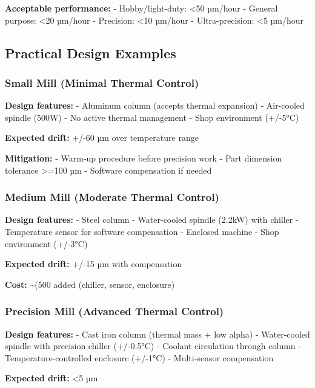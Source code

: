 \documentclass[
]{article}
\begin{document}
\textbf{Acceptable performance:} - Hobby/light-duty: \textless50 µm/hour
- General purpose: \textless20 µm/hour - Precision: \textless10 µm/hour
- Ultra-precision: \textless5 µm/hour

\subsection{Practical Design Examples}\label{practical-design-examples}

\subsubsection{Small Mill (Minimal Thermal
Control)}\label{small-mill-minimal-thermal-control}

\textbf{Design features:} - Aluminum column (accepts thermal expansion)
- Air-cooled spindle (500W) - No active thermal management - Shop
environment (+/-5°C)

\textbf{Expected drift:} +/-60 µm over temperature range

\textbf{Mitigation:} - Warm-up procedure before precision work - Part
dimension tolerance \textgreater=100 µm - Software compensation if
needed

\subsubsection{Medium Mill (Moderate Thermal
Control)}\label{medium-mill-moderate-thermal-control}

\textbf{Design features:} - Steel column - Water-cooled spindle (2.2kW)
with chiller - Temperature sensor for software compensation - Enclosed
machine - Shop environment (+/-3°C)

\textbf{Expected drift:} +/-15 µm with compensation

\textbf{Cost:} \textasciitilde(500 added (chiller, sensor, enclosure)

\subsubsection{Precision Mill (Advanced Thermal
Control)}\label{precision-mill-advanced-thermal-control}

\textbf{Design features:} - Cast iron column (thermal mass + low alpha)
- Water-cooled spindle with precision chiller (+/-0.5°C) - Coolant
circulation through column - Temperature-controlled enclosure (+/-1°C) -
Multi-sensor compensation

\textbf{Expected drift:} \textless5 µm
\end{document}

